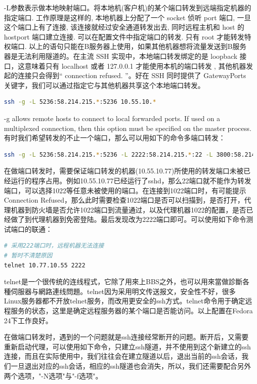 \documentclass[12pt]{book}
\numberwithin{dummy}{section}
\theoremstyle{ocrenumbox}
\theoremstyle{blacknumex}
\theoremstyle{blacknumbox}
\theoremstyle{ocrenum}
\begin{document}
-L参数表示做本地映射端口。将本地机(客户机)的某个端口转发到远端指定机器的指定端口. 工作原理是这样的, 本地机器上分配了一个 socket 侦听 port 端口, 一旦这个端口上有了连接, 该连接就经过安全通道转发出去, 同时远程主机和 host 的 hostport 端口建立连接. 可以在配置文件中指定端口的转发. 只有 root 才能转发特权端口. 以上的语句只能在B服务器上使用，如果其他机器想将流量发送到B服务器是无法利用隧道的。在主流 SSH 实现中，本地端口转发绑定的是 loopback 接口，这意味着只有 localhost 或者 127.0.0.1 才能使用本机的端口转发 , 其他机器发起的连接只会得到“ connection refused. ”。好在 SSH 同时提供了 GatewayPorts 关键字，我们可以通过指定它与其他机器共享这个本地端口转发。

\begin{lstlisting}[language=Bash]
ssh -g -L 5236:58.214.215.*:5236 10.55.10.*
\end{lstlisting}

-g allows remote hosts to connect to local forwarded ports.  If used on a multiplexed connection, then this option must be specified on the master process.有时我们希望转发的不止一个端口，那么可以用如下的命令多端口转发：

\begin{lstlisting}[language=Bash]
ssh -g -L 5236:58.214.215.*:5236 -L 2222:58.214.215.*:22 -L 3800:58.214.215.*:3800 10.55.10.77
\end{lstlisting}

在做端口转发时，需要保证端口转发的机器(10.55.10.77)所使用的转发端口未被已经运行的程序占用。例如10.55.10.77已经运行了sshd，那么22端口就不能作为转发端口，可以选择1022等任意未被使用的端口。在连接到1022端口时，有可能提示Connection Refused，那么此时需要检查1022端口是否可以扫描到，是否打开，代理机器到防火墙是否允许1022端口到流量通过，以及代理机器1022的配置，是否已经做了到代理机器到免密登陆。最后发现改为2222端口即可。可以使用如下命令测试端口的联通：

\begin{lstlisting}[language=Bash]
# 采用222端口时，远程机器无法连接
# 暂时不清楚原因
telnet 10.77.10.55 2222
\end{lstlisting}

telnet是一个很传统的连线程式，它除了用來上BBS之外，也可以用來當做診斷各種伺服器与網路連线問題。telnet因为采用明文传送报文，安全性不好，很多Linux服务器都不开放telnet服务，而改用更安全的ssh方式。telnet命令用于确定远程服务的状态，这里是确定远程服务器的某个端口是否能访问。以上配置在Fedora 24下工作良好。

在做端口转发时，遇到的一个问题就是ssh连接经常断开的问题。断开后，又需要重新启动代理，可以使用如下命令，只建立ssh隧道，并不使用到这个新建立的ssh连接，而且在实际使用中，我们往往会在建立隧道以后，退出当前的ssh会话，我们一旦退出对应的ssh会话，相应的ssh隧道也会消失，所以，我们还需要配合另外两个选项，"-N选项"与"-f选项"。
\end{document}

